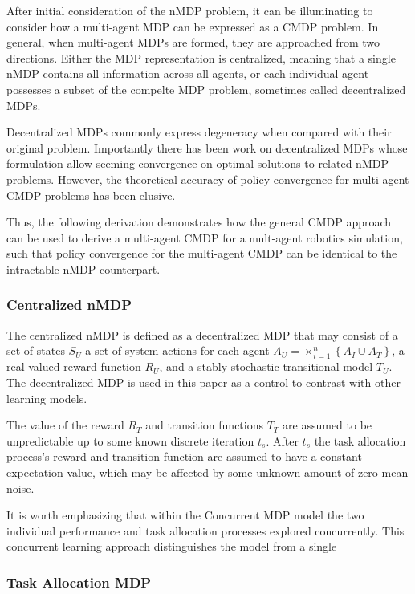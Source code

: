 \documentclass[compsoc,journal,letterpaper,10pt,draftcls,twocolumn]{IEEEtran}
\begin{document}
After initial consideration of the nMDP problem, it can be illuminating
to consider how a multi-agent MDP can be expressed as a CMDP problem. In
general, when multi-agent MDPs are formed, they are approached from two
directions. Either the MDP representation is centralized, meaning that a
single nMDP contains all information across all agents, or each
individual agent possesses a subset of the compelte MDP problem,
sometimes called decentralized MDPs.

Decentralized MDPs commonly express degeneracy when compared with their
original problem. Importantly there has been work on decentralized MDPs
whose formulation allow seeming convergence on optimal solutions to
related nMDP problems. However, the theoretical accuracy of policy
convergence for multi-agent CMDP problems has been elusive.

Thus, the following derivation demonstrates how the general CMDP
approach can be used to derive a multi-agent CMDP for a mult-agent
robotics simulation, such that policy convergence for the multi-agent
CMDP can be identical to the intractable nMDP counterpart.

\subsubsection{Centralized nMDP}\label{centralized-nmdp}

The centralized nMDP is defined as a decentralized MDP that may consist
of a set of states \(S_{U}\) a set of system actions for each agent
\(A_{U} = \times_{i = 1}^{n}\left\{ A_{I} \cup A_{T} \right\}\), a real
valued reward function \(R_{U}\), and a stably stochastic transitional
model \(T_{U}\). The decentralized MDP is used in this paper as a
control to contrast with other learning models.

The value of the reward \(R_{T}\) and transition functions \(T_{T}\) are
assumed to be unpredictable up to some known discrete iteration
\(t_{s}\). After \(t_{s}\) the task allocation process's reward and
transition function are assumed to have a constant expectation value,
which may be affected by some unknown amount of zero mean noise.

It is worth emphasizing that within the Concurrent MDP model the two
individual performance and task allocation processes explored
concurrently. This concurrent learning approach distinguishes the model
from a single

\subsubsection{Task Allocation MDP}\label{task-allocation-mdp}
\end{document}
